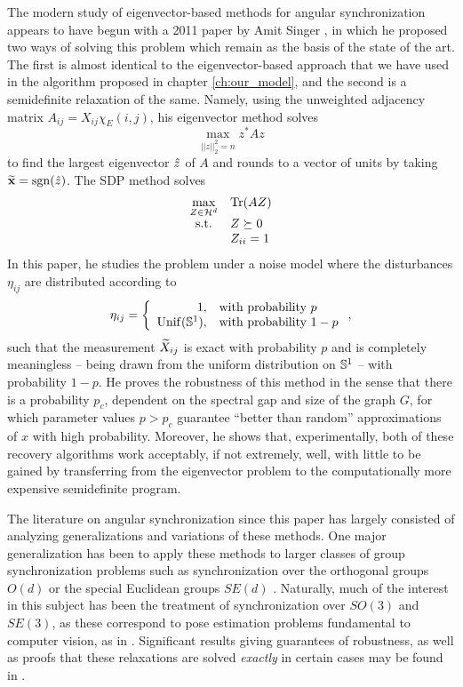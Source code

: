 The modern study of eigenvector-based methods for angular synchronization appears to have begun with a 2011 paper by Amit Singer \cite{singer2011ang_sync}, in which he proposed two ways of solving this problem which remain as the basis of the state of the art.  The first is almost identical to the eigenvector-based approach that we have used in the algorithm proposed in chapter \ref{ch:our_model}, and the second is a semidefinite relaxation of the same.  Namely, using the unweighted adjacency matrix $A_{ij} = X_{ij} \chi_E(i, j)$, his eigenvector method solves \[ \max_{||z||_2^2 = n} z^* A z \] to find the largest eigenvector $\hat{z}$ of $A$ and rounds to a vector of units by taking $\widetilde{\mathbf x} = \operatorname{sgn}(\hat{z})$.  The SDP method solves \begin{equation}\begin{array}{cl} \max\limits_{Z \in \mathcal{H}^d} & \operatorname{Tr}(A Z) \\ \text{s.t.} & Z \succeq 0 \\ & Z_{ii} = 1 \end{array} \label{eq:angsyncSDPsinger}\end{equation}  In this paper, he studies the problem under a noise model where the disturbances $\eta_{ij}$ are distributed according to \[\eta_{ij} = \left\{\begin{array}{r@{,\quad}l} 1 & \text{with probability}\ p \\ \mathrm{Unif}(\Sbb^1) & \text{with probability}\ 1 - p\end{array}\right.,\] such that the measurement $\widetilde{X}_{ij}$ is exact with probability $p$ and is completely meaningless -- being drawn from the uniform distribution on $\mathbb{S}^1$ -- with probability $1 - p$.  He proves the robustness of this method in the sense that there is a probability $p_c$, dependent on the spectral gap and size of the graph $G$, for which parameter values $p > p_c$ guarantee ``better than random'' approximations of $x$ with high probability.  Moreover, he shows that, experimentally, both of these recovery algorithms work acceptably, if not extremely, well, with little to be gained by transferring from the eigenvector problem to the computationally more expensive semidefinite program.

The literature on angular synchronization since this paper has largely consisted of analyzing generalizations and variations of these methods.  One major generalization has been to apply these methods to larger classes of group synchronization problems such as synchronization over the orthogonal groups $O(d)$ or the special Euclidean groups $SE(d)$ \cite{bansing2013bigcheeg,briales2017cartan_sync,bandeira2016se_sync}.  Naturally, much of the interest in this subject has been the treatment of synchronization over $SO(3)$ and $SE(3)$, as these correspond to pose estimation problems fundamental to computer vision, as in \cite{enqvist2011nonsequential, olsson2017rot_avg, fischler1981ransac, govindu2006motion_avg}.  Significant results giving guarantees of robustness, as well as proofs that these relaxations are solved \emph{exactly} in certain cases may be found in \cite{alexeev2014phase, bandeira2016tightness, olsson2017rot_avg, bandeira2016se_sync}.
